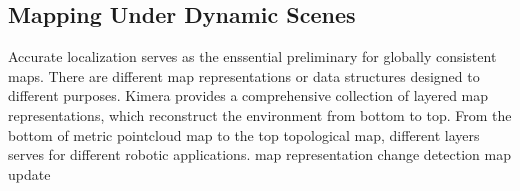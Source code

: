 \subsection{Mapping Under Dynamic Scenes}
Accurate localization serves as the enssential preliminary for globally consistent maps. There are different map representations or data structures designed to different purposes. Kimera\cite{Rosinol20icra-Kimera} provides a comprehensive collection of layered map representations, which reconstruct the environment from bottom to top. From the bottom of metric pointcloud map to the top topological map, different layers serves for different robotic applications. 
map representation
change detection 
map update

